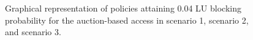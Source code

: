 \begin{figure}[h]
\centering
{}
\caption[]{Graphical representation of policies attaining 0.04 LU blocking probability for the auction-based access in scenario 1, scenario 2, and scenario 3.}\label{fig:Policies}
\end{figure}

